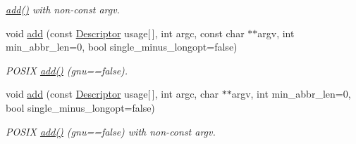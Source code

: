 \begin{DoxyCompactItemize}
\begin{DoxyCompactList}\small\item\em \hyperlink{structxmem_1_1config_1_1third__party_1_1_stats_a067da76c0d531c9cceb5fd1c3b8c6a2b}{add()} with non-\/const argv. \end{DoxyCompactList}\item 
\hypertarget{structxmem_1_1config_1_1third__party_1_1_stats_aa19ac2a7dda954c719d4de88b8bebe61}{}void \hyperlink{structxmem_1_1config_1_1third__party_1_1_stats_aa19ac2a7dda954c719d4de88b8bebe61}{add} (const \hyperlink{structxmem_1_1config_1_1third__party_1_1_descriptor}{Descriptor} usage\mbox{[}$\,$\mbox{]}, int argc, const char $\ast$$\ast$argv, int min\+\_\+abbr\+\_\+len=0, bool single\+\_\+minus\+\_\+longopt=false)\label{structxmem_1_1config_1_1third__party_1_1_stats_aa19ac2a7dda954c719d4de88b8bebe61}

\begin{DoxyCompactList}\small\item\em P\+O\+S\+I\+X \hyperlink{structxmem_1_1config_1_1third__party_1_1_stats_a067da76c0d531c9cceb5fd1c3b8c6a2b}{add()} (gnu==false). \end{DoxyCompactList}\item 
\hypertarget{structxmem_1_1config_1_1third__party_1_1_stats_a9168980abd6cfd4c2f6fd9d8dbfa9910}{}void \hyperlink{structxmem_1_1config_1_1third__party_1_1_stats_a9168980abd6cfd4c2f6fd9d8dbfa9910}{add} (const \hyperlink{structxmem_1_1config_1_1third__party_1_1_descriptor}{Descriptor} usage\mbox{[}$\,$\mbox{]}, int argc, char $\ast$$\ast$argv, int min\+\_\+abbr\+\_\+len=0, bool single\+\_\+minus\+\_\+longopt=false)\label{structxmem_1_1config_1_1third__party_1_1_stats_a9168980abd6cfd4c2f6fd9d8dbfa9910}

\begin{DoxyCompactList}\small\item\em P\+O\+S\+I\+X \hyperlink{structxmem_1_1config_1_1third__party_1_1_stats_a067da76c0d531c9cceb5fd1c3b8c6a2b}{add()} (gnu==false) with non-\/const argv. \end{DoxyCompactList}\end{DoxyCompactItemize}
